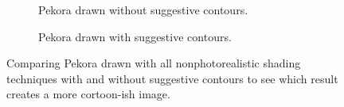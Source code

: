 \documentclass[10pt,twocolumn,letterpaper]{article}
\begin{document}
\begin{figure}
    \centering
    \begin{subfigure}{.48\linewidth}
        \caption{Pekora drawn without suggestive contours.}
        \label{fig:pekora-base}
    \end{subfigure}
    \hfill
    \begin{subfigure}{.48\linewidth}
        \caption{Pekora drawn with suggestive contours.}
        \label{fig:pekora-final}
    \end{subfigure}
    \caption{Comparing Pekora drawn with all nonphotorealistic shading techniques with and without suggestive contours to see which result creates a more cortoon-ish image.}
    \label{fig:pekora-compare}
\end{figure}
\end{document}
